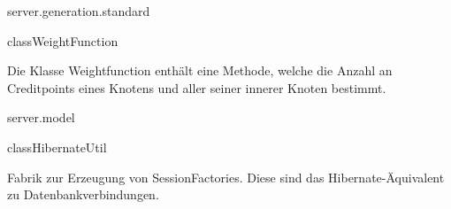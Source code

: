 \begin{texdocpackage}{server.generation.standard}
\begin{texdocclass}{class}{WeightFunction}
\label{texdoclet:edu.kit.informatik.studyplan.server.generation.standard.WeightFunction}
\begin{texdocclassintro}
Die Klasse Weightfunction enthält eine Methode, welche die Anzahl an Creditpoints
 eines Knotens und aller seiner innerer Knoten bestimmt.\end{texdocclassintro}
\begin{texdocclassconstructors}
\end{texdocclassconstructors}
\begin{texdocclassmethods}
\end{texdocclassmethods}
\end{texdocclass}


\end{texdocpackage}



\begin{texdocpackage}{server.model}
\label{texdoclet:edu.kit.informatik.studyplan.server.model}

\begin{texdocclass}{class}{HibernateUtil}
\label{texdoclet:edu.kit.informatik.studyplan.server.model.HibernateUtil}
\begin{texdocclassintro}
Fabrik zur Erzeugung von SessionFactories. Diese sind das Hibernate-Äquivalent zu Datenbankverbindungen.\end{texdocclassintro}
\begin{texdocclassconstructors}
\end{texdocclassconstructors}
\begin{texdocclassmethods}
\end{texdocclassmethods}
\end{texdocclass}


\end{texdocpackage}




